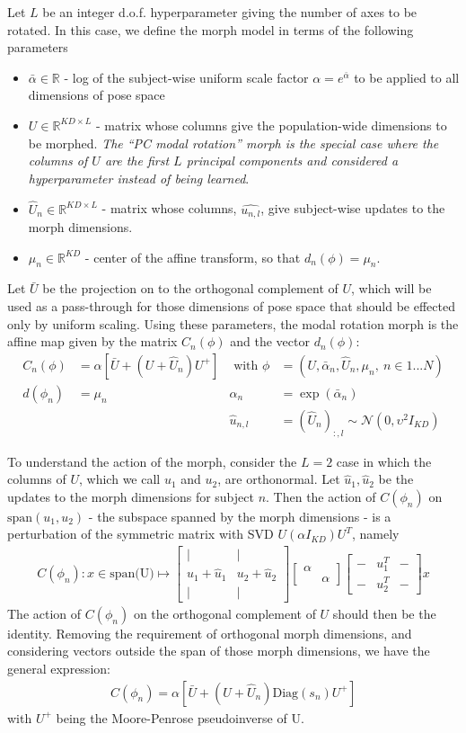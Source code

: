 \documentclass{article}         %
\newcommand{\RR}{\mathbb{R}}
\newcommand{\NN}{\mathcal{N}}
\newcommand{\mat}[1]{\begin{matrix} #1 \end{matrix}}
\newcommand{\pn}[1]{\left( #1 \right)}
\newcommand{\bc}[1]{\left[ #1 \right]}
\begin{document}
Let $L$ be an integer d.o.f. hyperparameter giving the number of axes to be rotated. In this case, we define the morph model in terms of the following parameters
\begin{itemize}
    \item $\bar\alpha\in\RR$ - log of the subject-wise uniform scale factor $\alpha = e^{\bar{\alpha}}$ to be applied to all dimensions of pose space
    \item $U\in \RR^{KD\times L}$ - matrix whose columns give the population-wide dimensions to be morphed. \textit{The ``PC modal rotation'' morph is the special case where the columns of $U$ are the first $L$ principal components and considered a hyperparameter instead of being learned}.
    \item $\hat{U}_n\in\RR^{KD \times L}$ - matrix whose columns, $\hat{u_{n, l}}$, give subject-wise updates to the morph dimensions.
    \item $\mu_n\in \RR^{KD}$ - center of the affine transform, so that $d_n(\phi) = \mu_n$. 
\end{itemize}

Let $\bar{U}$ be the projection on to the orthogonal complement of $U$, which will be used as a pass-through for those dimensions of pose space that should be effected only by uniform scaling. Using these parameters, the modal rotation morph is the affine map given by the matrix $C_n(\phi)$ and the vector $d_n(\phi)$:
\begin{align}
    C_n(\phi) &= \alpha \bc{ \bar{U} + \pn{U + \hat{U}_n}U^+ } &\text{\ with\ } \phi &= (U, \bar\alpha_n, \hat{U}_n, \mu_n,\ n\in1...N)
    \\
    d(\phi_n) &= \mu_n & \alpha_n &= \exp\pn{\bar\alpha_n}
    \\
    && \hat{u}_{n, l} &= (\hat{U}_{n})_{:,l} \sim \NN(0, \upsilon^2 I_{KD}) 
\end{align}


To understand the action of the morph, consider the $L=2$ case in which the columns of $U$, which we call $u_1$ and $u_2$, are orthonormal. Let $\hat{u}_1, \hat{u}_2$ be the updates to the morph dimensions for subject $n$. Then the action of $C(\phi_n)$ on $\text{span}(u_1, u_2)$ - the subspace spanned by the morph dimensions - is a perturbation of the symmetric matrix with SVD $U (\alpha I_{KD}) U^T$, namely
\begin{align}
    C(\phi_n) : x\in \text{span(U)} \mapsto \bc{\mat{ | & | \\ u_1 + \hat{u}_1 & u_2 + \hat{u}_2 \\ | & |  }}
    \bc{\mat{ \alpha & \\ & \alpha }}
    \bc{\mat{ - & u_1^T & - \\ - & u_2^T & -}}x
\end{align}
The action of $C(\phi_n)$ on the orthogonal complement of $U$ should then be the identity. Removing the requirement of orthogonal morph dimensions, and considering vectors outside the span of those morph dimensions, we have the general expression:
\begin{align}
    C(\phi_n) = \alpha \bc{ \bar{U} + \pn{U + \hat{U}_n}\text{Diag}\pn{s_n}U^+ }
\end{align}
with $U^+$ being the Moore-Penrose pseudoinverse of U.
\end{document}
